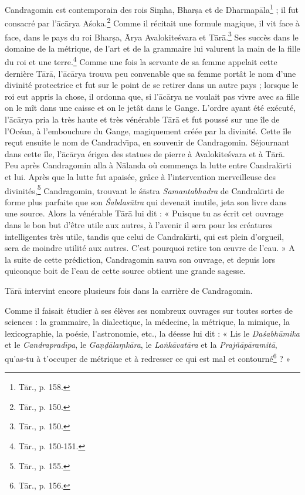 \documentclass[a4paper, 11pt, oneside, french]{article}
\begin{document}
Candragomin est contemporain des rois Si\d{m}ha, Bhar\d{s}a et de Dharmap\={a}la\footnote{T\={a}r., p. 158.} ; il fut consacré par l'\={a}c\={a}rya A\'{s}oka.\footnote{T\={a}r., p. 150.} Comme il récitait une formule magique, il vit face à face, dans le pays du roi Bhar\d{s}a, \={A}rya Avalokite\'{s}vara et T\={a}r\={a}.\footnote{T\={a}r., p. 150.} Ses succès dans le domaine de la métrique, de l'art et de la grammaire lui valurent la main de la fille du roi et une terre.\footnote{T\={a}r., p. 150-151.} Comme une fois la servante de sa femme appelait cette dernière T\={a}r\={a}, l'\={a}c\={a}rya trouva peu convenable que sa femme portât le nom d'une divinité protectrice et fut sur le point de se retirer dans un autre pays ; lorsque le roi eut appris la chose, il ordonna que, si l'\={a}c\={a}rya ne voulait pas vivre avec sa fille on le mît dans une caisse et on le jetât dans le Gange. L'ordre ayant été exécuté, l'\={a}c\={a}rya pria la très haute et très vénérable T\={a}r\={a} et fut poussé sur une île de l'Océan, à l'embouchure du Gange, magiquement créée par la divinité. Cette île reçut ensuite le nom de Candradv\={\i}pa, en souvenir de Candragomin. Séjournant dans cette île, l'\={a}c\={a}rya érigea des statues de pierre à Avalokite\'{s}vara et à T\={a}r\={a}. Peu après Candragomin alla à N\={a}landa où commença la lutte entre Candrak\={\i}rti et lui. Après que la lutte fut apaisée, grâce à l'intervention merveilleuse des divinités,\footnote{T\={a}r., p. 155.} Candragomin, trouvant le \'{s}\={a}stra \emph{Samantabhadra} de Candrak\={\i}rti de forme plus parfaite que son \emph{\'{S}abdas\={u}tra} qui devenait inutile, jeta son livre dans une source. Alors la vénérable T\={a}r\={a} lui dit : « Puisque tu as écrit cet ouvrage dans le bon but d'être utile aux autres, à l'avenir il sera pour les créatures intelligentes très utile, tandis que celui de Candrak\={\i}rti, qui est plein d'orgueil, sera de moindre utilité aux autres. C'est pourquoi retire ton œuvre de l'eau. » A la suite de cette prédiction, Candragomin sauva son ouvrage, et depuis lors quiconque boit de l'eau de cette source obtient une grande sagesse.

T\={a}r\={a} intervint encore plusieurs fois dans la carrière de Candragomin.

Comme il faisait étudier à ses élèves ses nombreux ouvrages sur toutes sortes de sciences : la grammaire, la dialectique, la médecine, la métrique, la mimique, la lexicographie, la poésie, l'astronomie, etc., la déesse lui dit : « Lis le \emph{Da\'{s}abh\={u}mika} et le \emph{Candraprad\={\i}pa}, le \emph{Ga\d{n}\d{d}\={a}la\d{m}k\={a}ra}, le \emph{La\.{n}k\={a}vat\={a}ra} et la \emph{Praj\~{n}\={a}p\={a}ramit\={a}}, qu'as-tu à t'occuper de métrique et à redresser ce qui est mal et contourné\footnote{T\={a}r., p. 156.} ? »
\end{document}
